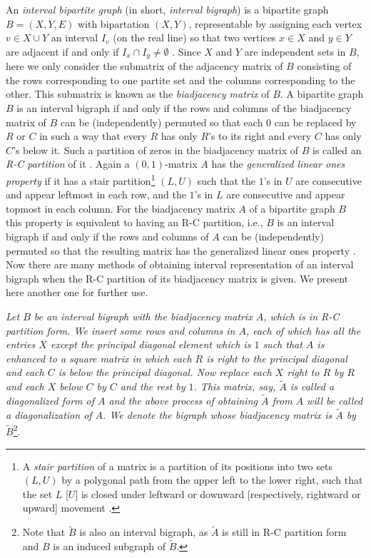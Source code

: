 \documentclass[secthm]{elsart}
\begin{document}
\vspace{-1.25em} An {\em{interval bipartite graph}} (in short, {\em interval bigraph}) is a bipartite graph $B=(X,Y,E)$ with bipartation $(X,Y)$, representable by assigning each vertex $v\in X\cup Y$ an interval $I_v$ (on the real line) so that two vertices $x\in X$ and $y\in Y$ are adjacent if and only if $I_x\cap I_y\neq\emptyset$ \cite{HKM}. Since $X$ and $Y$ are independent sets in $B$, here we only consider the submatrix of the adjacency matrix of $B$ consisting of the rows corresponding to one partite set and the columns corresponding to the other. This submatrix is known as the {\em{biadjacency matrix}} of $B$. A bipartite graph $B$ is an interval bigraph if and only if the rows and columns of the biadjacency matrix of $B$ can be (independently) permuted so that each $0$ can be replaced by $R$ or $C$ in such a way that every $R$ has only $R$'s to its right and every $C$ has only $C$'s below it. Such a partition of zeros in the biadjacency matrix of $B$ is called an {\em{R-C partition}} of it \cite{SDRW}. Again a $(0,1)$-matrix $A$ has the {\em generalized linear ones property} if it has a stair partition\footnote{A {\em stair partition} of a matrix is a partition of its positions into two sets $(L,U)$ by a polygonal path from the upper left to the lower right, such that the set $L$ [$U$] is closed under leftward or downward [respectively, rightward or upward] movement \cite{SDW}.} $(L,U)$ such that the $1$'s in $U$ are consecutive and appear leftmost in each row, and the $1$'s in $L$ are consecutive and appear topmost in each column. For the biadjacency matrix $A$ of a bipartite graph $B$ this property is equivalent to having an R-C partition, i.e., $B$ is an interval bigraph if and only if the rows and columns of $A$ can be (independently) permuted so that the resulting matrix has the generalized linear ones property \cite{SDW}. Now there are many methods \cite{Mu,SDRW,W} of obtaining interval representation of an interval bigraph when the R-C partition of its biadjacency matrix is given. We present here another one for further use. 

\begin{defn}
{\em Let $B$ be an interval bigraph with the biadjacency matrix $A$, which is in R-C partition form. We insert some rows and columns in $A$, each of which has all the entries $X$ except the principal diagonal element which is $1$ such that $A$ is enhanced to a square matrix in which each $R$ is right to the principal diagonal and each $C$ is below the principal diagonal. Now replace each $X$ right to $R$ by $R$ and each $X$ below $C$ by $C$ and the rest by $1$. This matrix, say, $\tilde{A}$ is called a {\em diagonalized} form of $A$ and the above process of obtaining $\tilde{A}$ from $A$ will be called a {\em{diagonalization}} of $A$. We denote the bigraph whose biadjacency matrix is $\tilde{A}$ by $\tilde{B}$}\footnote{Note that $\tilde{B}$ is also an interval bigraph, as $\tilde{A}$ is still in R-C partition form and $B$ is an induced subgraph of $\tilde{B}$.}.
\end{defn}
\end{document}
